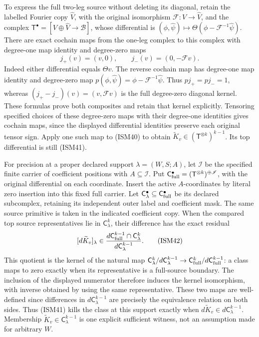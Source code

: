 To express the full two-leg source without deleting
its diagonal, retain the labelled Fourier copy
\(\widehat V\), with the original isomorphism
\(\mathcal F:V\to\widehat V\), and the complex
\(\mathsf T^\bullet=
[V\oplus\widehat V\to\mathscr B]\), whose differential
is \((\phi,\widehat\psi)\mapsto
\Theta(\phi-\mathcal F^{-1}\widehat\psi)\).
There are exact cochain maps from the one-leg complex
to this complex with degree-one map identity and
degree-zero maps
\[
 j_+(v)=(v,0),\qquad j_-(v)=(0,-\mathcal Fv).
\]
Indeed either differential equals \(\Theta v\).
The reverse cochain map has degree-one map identity
and degree-zero map
\(p(\phi,\widehat\psi)=\phi-\mathcal F^{-1}\widehat\psi\).
Thus \(pj_+=pj_-=1\), whereas
\((j_+-j_-)(v)=(v,\mathcal Fv)\) is the full
degree-zero diagonal kernel.  These formulas prove
both composites and retain that kernel explicitly.
Tensoring specified choices of these degree-zero
maps with their degree-one identities gives cochain
maps, since the displayed differential identities
preserve each original tensor sign.  Apply one such
map to (ISM40) to obtain
\(\widetilde K_v\in(\mathsf T^{\otimes k})^{k-1}\).
Its top differential is still (ISM41).

For precision at a proper declared support
\(\lambda=(W,S;A)\), let
\(\mathscr I\) be the specified finite carrier of
coefficient positions with \(A\subseteq\mathscr I\).
Put
\(\mathsf C_{\rm full}^\bullet=
(\mathsf T^{\otimes k})^{\oplus\mathscr I}\),
with the original differential on each coordinate.
Insert the active \(A\)-coordinates by literal zero
insertion into this fixed full carrier.  Let
\(\mathsf C_\lambda^\bullet\subseteq
\mathsf C_{\rm full}^\bullet\)
be its declared subcomplex, retaining its independent
outer label and coefficient mask.  The same source
primitive is taken in the indicated coefficient copy.
When the compared top source representatives lie
in \(\mathsf C_\lambda^k\), their difference has
the exact residual
\[
 [d\widetilde K_v]_\lambda\in
 \frac{d\mathsf C_{\rm full}^{k-1}\cap\mathsf C_\lambda^k}
      {d\mathsf C_\lambda^{k-1}}.
 \tag{ISM42}
\]
This quotient is the kernel of the natural map
\(\mathsf C_\lambda^k/d\mathsf C_\lambda^{k-1}
\to\mathsf C_{\rm full}^k/d\mathsf C_{\rm full}^{k-1}\):
a class maps
to zero exactly when its representative is a
full-source boundary.  The inclusion of the
displayed numerator therefore induces the
kernel isomorphism, with inverse obtained by
using the same representative.  These two maps
are well-defined since differences in
\(d\mathsf C_\lambda^{k-1}\) are precisely the
equivalence relation on both sides.
Thus (ISM41) kills the class at this support
exactly when \(d\widetilde K_v\in d\mathsf C_\lambda^{k-1}\).
Membership \(\widetilde K_v\in\mathsf C_\lambda^{k-1}\)
is one explicit sufficient witness, not an
assumption made for arbitrary \(W\).


